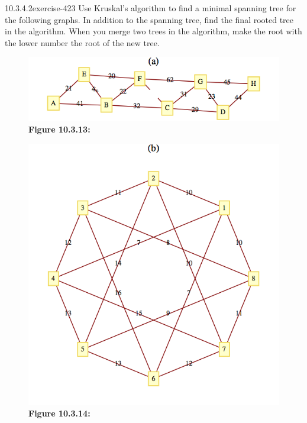 \documentclass[twoside,10pt,]{book}
\numberwithin{equation}{section}
\begin{document}
\begin{divisionsolution}{10.3.4.2}{}{exercise-423}%
\hypertarget{p-3648}{}%
Use Kruskal's algorithm to find a minimal spanning tree for the following graphs. In addition to the spanning tree, find the final rooted tree in the algorithm.  When you merge two trees in the algorithm, make the root with the lower number the root of the new tree.%
\begin{figure}
\centering
\includegraphics[width=1\linewidth]{images/fig-exercise-10-3-2a.png}
\caption*{\textbf{Figure 10.3.13:} }
\end{figure}
\begin{figure}
\centering
\includegraphics[width=1\linewidth]{images/fig-exercise-10-3-2b.png}
\caption*{\textbf{Figure 10.3.14:} }
\end{figure}
\end{divisionsolution}%
\end{document}
